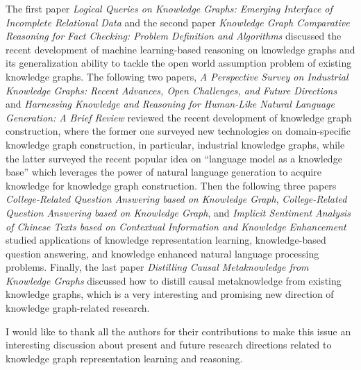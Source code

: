 \documentclass[11pt]{article}
\begin{document}
The first paper {\it Logical Queries on Knowledge Graphs: Emerging Interface of Incomplete Relational Data} and the second paper {\it Knowledge Graph Comparative Reasoning for Fact Checking: Problem Definition and Algorithms} discussed the recent development of machine learning-based reasoning on knowledge graphs and its generalization ability to tackle the open world assumption problem of existing knowledge graphs. The following two papers, {\it A Perspective Survey on Industrial Knowledge Graphs: Recent Advances, Open Challenges, and Future Directions} and {\it Harnessing Knowledge and Reasoning for Human-Like Natural Language Generation: A Brief Review} reviewed the recent development of knowledge graph construction, where the former one surveyed new technologies on domain-specific knowledge graph construction, in particular, industrial knowledge graphs, while the latter surveyed the recent popular idea on  ``language model as a knowledge base'' which leverages the power of natural language generation to acquire knowledge for knowledge graph construction. Then the following three papers {\it College-Related Question Answering based on Knowledge Graph}, {\it College-Related Question Answering based on Knowledge Graph}, and {\it Implicit Sentiment Analysis of Chinese Texts based on Contextual Information and Knowledge Enhancement} studied applications of knowledge representation learning, knowledge-based question answering, and knowledge enhanced natural language processing problems. Finally, the last paper {\it Distilling Causal Metaknowledge from Knowledge Graphs} discussed how to distill causal metaknowledge from existing knowledge graphs, which is a very interesting and promising new direction of knowledge graph-related research.

I would like to thank all the authors for their contributions to make this issue an interesting discussion about present and future research directions related to knowledge graph representation learning and reasoning.
\end{document}
